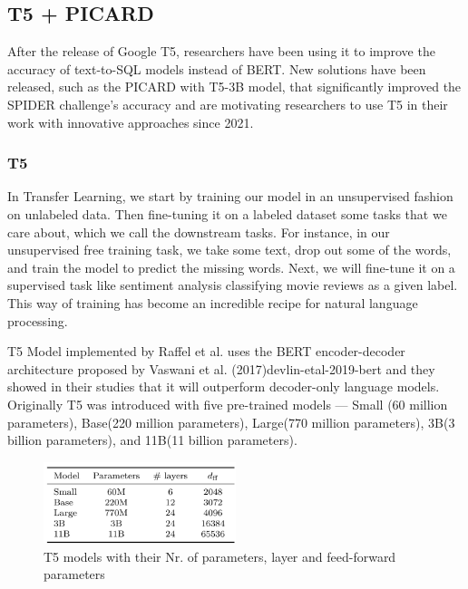 \subsection{T5 + PICARD} \label{picard}


After the release of Google T5, researchers have been using it to improve the accuracy of text-to-SQL models instead of BERT. New solutions have been released, such as the PICARD with T5-3B model, that significantly improved the SPIDER challenge's accuracy and are motivating researchers to use T5 in their work with innovative approaches since 2021.

\subsubsection{T5}

In Transfer Learning, we start by training our model in an unsupervised fashion on unlabeled data. Then fine-tuning it on a labeled dataset some tasks that we care about, which we call the downstream tasks. For instance, in our unsupervised free training task, we take some text, drop out some of the words, and train the model to predict the missing words. Next, we will fine-tune it on a supervised task like sentiment analysis classifying movie reviews as a given label. This way of training has become an incredible recipe for natural language processing.

T5 Model implemented by Raffel et al. \cite{raffel_exploring_2020} uses the BERT encoder-decoder architecture proposed by Vaswani et al. (2017){devlin-etal-2019-bert} and they showed in their studies that it will outperform decoder-only language models. Originally T5 was introduced with five pre-trained models — Small (60 million parameters), Base(220 million parameters), Large(770 million parameters), 3B(3 billion parameters), and 11B(11 billion parameters)\cite{raffel_exploring_2020}.

\begin{figure}[h]
    \centering
    \includegraphics[width=0.5\textwidth]{pics/picard/t5-size.png}
    \caption{T5 models with their Nr. of parameters, layer and feed-forward parameters\cite{raffel_exploring_2020}}
\end{figure}

